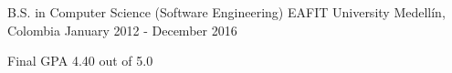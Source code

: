 \begin{cventries}
  \cventry
    {B.S. in Computer Science (Software Engineering)}
    {EAFIT University}
    {Medellín, Colombia}
    {January 2012 - December 2016}
    {
      \begin{cvitems}
        \item {Final GPA 4.40 out of 5.0}
      \end{cvitems}
    }
\end{cventries}

